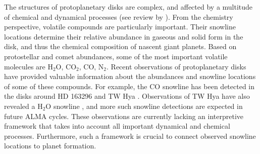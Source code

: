 \documentclass[apj]{emulateapj}
\newcommand{\emgr}[1]{\emph{ \color{gray} #1}}
\begin{document}
The structures of protoplanetary disks are complex, and affected by a multitude of chemical and dynamical processes (see review by \citealt{henning13}). From the chemistry perspective, volatile compounds are particularly important. Their snowline locations determine their relative abundance in gaseous and solid form in the disk, and thus the chemical composition of nascent giant planets. Based on protostellar and comet abundances, some of the most important volatile molecules are H$_2$O, CO$_2$, CO, N$_2$. Recent observations of protoplanetary disks have provided valuable information about the abundances and snowline locations of some of these compounds. For example, the CO snowline has been detected in the disks around HD 163296 \citep{qi11} and TW Hya \citep{qi13}. Observations of TW Hya have also revealed a H$_2$O snowline \citep{zhang13}, and more such snowline detections are expected in future ALMA cycles. These observations are currently lacking an interpretive framework that takes into account all important dynamical and chemical processes. Furthermore, such a framework is crucial to connect observed snowline locations to planet formation.


\end{document}
